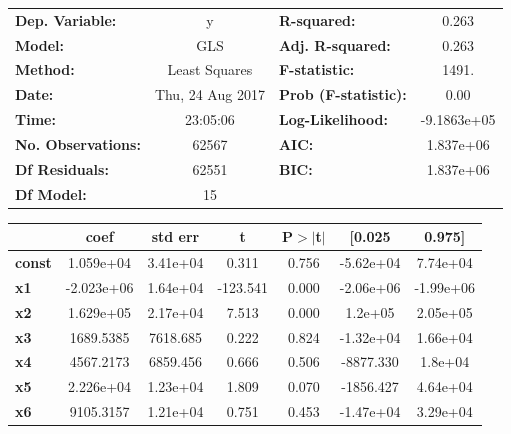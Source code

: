 \documentclass{article}
\begin{document}
\begin{center}
\begin{tabular}{lclc}
\toprule
\textbf{Dep. Variable:}    &        y         & \textbf{  R-squared:         } &      0.263    \\
\textbf{Model:}            &       GLS        & \textbf{  Adj. R-squared:    } &      0.263    \\
\textbf{Method:}           &  Least Squares   & \textbf{  F-statistic:       } &      1491.    \\
\textbf{Date:}             & Thu, 24 Aug 2017 & \textbf{  Prob (F-statistic):} &      0.00     \\
\textbf{Time:}             &     23:05:06     & \textbf{  Log-Likelihood:    } & -9.1863e+05   \\
\textbf{No. Observations:} &       62567      & \textbf{  AIC:               } &  1.837e+06    \\
\textbf{Df Residuals:}     &       62551      & \textbf{  BIC:               } &  1.837e+06    \\
\textbf{Df Model:}         &          15      & \textbf{                     } &               \\
\bottomrule
\end{tabular}
\begin{tabular}{lcccccc}
               & \textbf{coef} & \textbf{std err} & \textbf{t} & \textbf{P$>$$|$t$|$} & \textbf{[0.025} & \textbf{0.975]}  \\
\midrule
\textbf{const} &    1.059e+04  &     3.41e+04     &     0.311  &         0.756        &    -5.62e+04    &     7.74e+04     \\
\textbf{x1}    &   -2.023e+06  &     1.64e+04     &  -123.541  &         0.000        &    -2.06e+06    &    -1.99e+06     \\
\textbf{x2}    &    1.629e+05  &     2.17e+04     &     7.513  &         0.000        &      1.2e+05    &     2.05e+05     \\
\textbf{x3}    &    1689.5385  &     7618.685     &     0.222  &         0.824        &    -1.32e+04    &     1.66e+04     \\
\textbf{x4}    &    4567.2173  &     6859.456     &     0.666  &         0.506        &    -8877.330    &      1.8e+04     \\
\textbf{x5}    &    2.226e+04  &     1.23e+04     &     1.809  &         0.070        &    -1856.427    &     4.64e+04     \\
\textbf{x6}    &    9105.3157  &     1.21e+04     &     0.751  &         0.453        &    -1.47e+04    &     3.29e+04     \\

\end{tabular}
\end{center}
\end{document}
